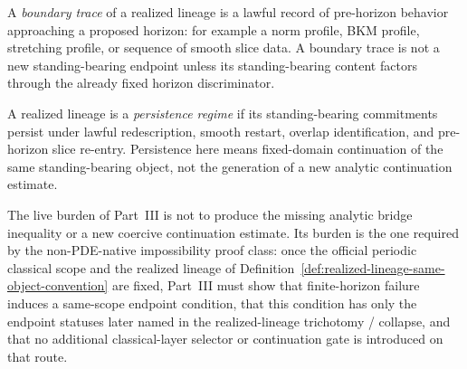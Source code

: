\begin{manualdefinition}
\label{def:boundary-trace-realized-lineage}
A \emph{boundary trace} of a realized lineage is a lawful record of pre-horizon behavior approaching a proposed horizon: for example a norm profile, BKM profile, stretching profile, or sequence of smooth slice data. A boundary trace is not a new standing-bearing endpoint unless its standing-bearing content factors through the already fixed horizon discriminator.
\end{manualdefinition}

\begin{manualdefinition}
\label{def:persistence-regime-realized-lineage}
A realized lineage is a \emph{persistence regime} if its standing-bearing commitments persist under lawful redescription, smooth restart, overlap identification, and pre-horizon slice re-entry. Persistence here means fixed-domain continuation of the same standing-bearing object, not the generation of a new analytic continuation estimate.
\end{manualdefinition}

\begin{remark}\label{rem:partIII-claim-type-discipline}
The live burden of Part~III is not to produce the missing analytic bridge inequality or a new coercive continuation estimate. Its burden is the one required by the non-PDE-native impossibility proof class: once the official periodic classical scope and the realized lineage of Definition~\ref{def:realized-lineage-same-object-convention} are fixed, Part~III must show that finite-horizon failure induces a same-scope endpoint condition, that this condition has only the endpoint statuses later named in the realized-lineage trichotomy / collapse, and that no additional classical-layer selector or continuation gate is introduced on that route.
\end{remark}

